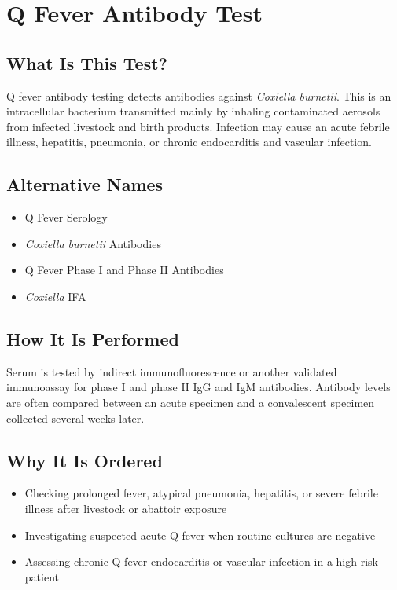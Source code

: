 \chapter{Q Fever Antibody Test}

\section*{What Is This Test?}
Q fever antibody testing detects antibodies against \textit{Coxiella burnetii}. This is an intracellular bacterium transmitted mainly by inhaling contaminated aerosols from infected livestock and birth products. Infection may cause an acute febrile illness, hepatitis, pneumonia, or chronic endocarditis and vascular infection.

\section*{Alternative Names}
\begin{itemize}
  \item Q Fever Serology
  \item \textit{Coxiella burnetii} Antibodies
  \item Q Fever Phase I and Phase II Antibodies
  \item \textit{Coxiella} IFA
\end{itemize}
\section*{How It Is Performed}
Serum is tested by indirect immunofluorescence or another validated immunoassay for phase I and phase II IgG and IgM antibodies. Antibody levels are often compared between an acute specimen and a convalescent specimen collected several weeks later.

\section*{Why It Is Ordered}
\begin{itemize}
  \item Checking prolonged fever, atypical pneumonia, hepatitis, or severe febrile illness after livestock or abattoir exposure
  \item Investigating suspected acute Q fever when routine cultures are negative
  \item Assessing chronic Q fever endocarditis or vascular infection in a high-risk patient
\end{itemize}

